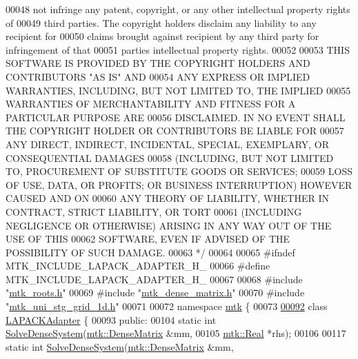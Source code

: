 \begin{DoxyCode}
00048 \textcolor{comment}{not infringe any patent, copyright, or any other intellectual property rights of}
00049 \textcolor{comment}{third parties. The copyright holders disclaim any liability to any recipient for}
00050 \textcolor{comment}{claims brought against recipient by any third party for infringement of that}
00051 \textcolor{comment}{parties intellectual property rights.}
00052 \textcolor{comment}{}
00053 \textcolor{comment}{THIS SOFTWARE IS PROVIDED BY THE COPYRIGHT HOLDERS AND CONTRIBUTORS "AS IS" AND}
00054 \textcolor{comment}{ANY EXPRESS OR IMPLIED WARRANTIES, INCLUDING, BUT NOT LIMITED TO, THE IMPLIED}
00055 \textcolor{comment}{WARRANTIES OF MERCHANTABILITY AND FITNESS FOR A PARTICULAR PURPOSE ARE}
00056 \textcolor{comment}{DISCLAIMED. IN NO EVENT SHALL THE COPYRIGHT HOLDER OR CONTRIBUTORS BE LIABLE FOR}
00057 \textcolor{comment}{ANY DIRECT, INDIRECT, INCIDENTAL, SPECIAL, EXEMPLARY, OR CONSEQUENTIAL DAMAGES}
00058 \textcolor{comment}{(INCLUDING, BUT NOT LIMITED TO, PROCUREMENT OF SUBSTITUTE GOODS OR SERVICES;}
00059 \textcolor{comment}{LOSS OF USE, DATA, OR PROFITS; OR BUSINESS INTERRUPTION) HOWEVER CAUSED AND ON}
00060 \textcolor{comment}{ANY THEORY OF LIABILITY, WHETHER IN CONTRACT, STRICT LIABILITY, OR TORT}
00061 \textcolor{comment}{(INCLUDING NEGLIGENCE OR OTHERWISE) ARISING IN ANY WAY OUT OF THE USE OF THIS}
00062 \textcolor{comment}{SOFTWARE, EVEN IF ADVISED OF THE POSSIBILITY OF SUCH DAMAGE.}
00063 \textcolor{comment}{*/}
00064 
00065 \textcolor{preprocessor}{#ifndef MTK\_INCLUDE\_LAPACK\_ADAPTER\_H\_}
00066 \textcolor{preprocessor}{#define MTK\_INCLUDE\_LAPACK\_ADAPTER\_H\_}
00067 
00068 \textcolor{preprocessor}{#include "\hyperlink{mtk__roots_8h}{mtk\_roots.h}"}
00069 \textcolor{preprocessor}{#include "\hyperlink{mtk__dense__matrix_8h}{mtk\_dense\_matrix.h}"}
00070 \textcolor{preprocessor}{#include "\hyperlink{mtk__uni__stg__grid__1d_8h}{mtk\_uni\_stg\_grid\_1d.h}"}
00071 
00072 \textcolor{keyword}{namespace }\hyperlink{namespacemtk}{mtk} \{
00073 
\hypertarget{mtk__lapack__adapter_8h_source_l00092}{}\hyperlink{classmtk_1_1LAPACKAdapter}{00092} \textcolor{keyword}{class }\hyperlink{classmtk_1_1LAPACKAdapter}{LAPACKAdapter} \{
00093  \textcolor{keyword}{public}:
00104   \textcolor{keyword}{static} \textcolor{keywordtype}{int} \hyperlink{classmtk_1_1LAPACKAdapter_a7428bccf74fd4a4af68fb7233846da22}{SolveDenseSystem}(\hyperlink{classmtk_1_1DenseMatrix}{mtk::DenseMatrix} &mm,
00105                               \hyperlink{group__c01-roots_gac080bbbf5cbb5502c9f00405f894857d}{mtk::Real} *rhs);
00106 
00117   \textcolor{keyword}{static} \textcolor{keywordtype}{int} \hyperlink{classmtk_1_1LAPACKAdapter_a7428bccf74fd4a4af68fb7233846da22}{SolveDenseSystem}(\hyperlink{classmtk_1_1DenseMatrix}{mtk::DenseMatrix} &mm,

\end{DoxyCode}
